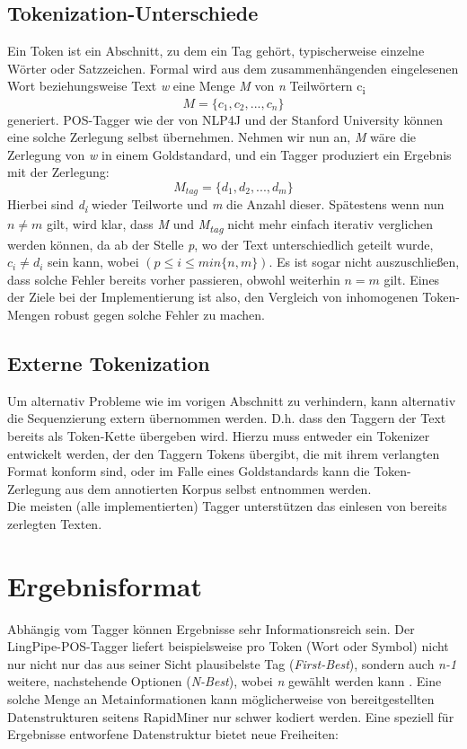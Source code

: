 \subsection{Tokenization-Unterschiede}
\label{sec:concept:sequence:tok}

Ein Token ist ein Abschnitt, zu dem ein Tag gehört, typischerweise einzelne Wörter oder Satzzeichen. Formal wird aus dem zusammenhängenden eingelesenen Wort beziehungsweise Text \textit{w} eine Menge \textit{M} von \textit{n} Teilwörtern c\textsubscript{i} 
 \[  M = \{ c_1 , c_2 , ... , c_n \} \] 
 generiert. POS-Tagger wie der von NLP4J \cite{choi} und der Stanford University \cite{Paper:StanfordTagger} können eine solche Zerlegung selbst übernehmen. Nehmen wir nun an, \textit{M} wäre die Zerlegung von \textit{w} in einem Goldstandard, und ein Tagger produziert ein Ergebnis mit der Zerlegung:
 \[  M_{tag} = \{ d_1 , d_2 , ... , d_m \} \]
Hierbei sind \textit{d\textsubscript{i}} wieder Teilworte und \textit{m} die Anzahl dieser. Spätestens wenn nun $n \neq m$ gilt, wird klar, dass \textit{M} und \textit{M\textsubscript{tag}} nicht mehr einfach iterativ verglichen werden können, da ab der Stelle \textit{p}, wo der Text unterschiedlich geteilt wurde, $ c_i \neq d_i $ sein kann, wobei $ (p \leq i \leq min\{ n, m \}) $. Es ist sogar nicht auszuschließen, dass solche Fehler bereits vorher passieren, obwohl weiterhin $n = m$ gilt.
\newline
Eines der Ziele bei der Implementierung ist also, den Vergleich von inhomogenen Token-Mengen robust gegen solche Fehler zu machen. 

\subsection{Externe Tokenization}
Um alternativ Probleme wie im vorigen Abschnitt zu verhindern, kann alternativ die Sequenzierung extern übernommen werden. D.h. dass den Taggern der Text bereits als Token-Kette übergeben wird. Hierzu muss entweder ein Tokenizer entwickelt werden, der den Taggern Tokens übergibt, die mit ihrem verlangten Format konform sind, oder im Falle eines Goldstandards kann die Token-Zerlegung aus dem annotierten Korpus selbst entnommen werden.
\\ Die meisten (alle implementierten) Tagger unterstützen das einlesen von bereits zerlegten Texten.



\section{Ergebnisformat}
\label{sec:concept:format}
Abhängig vom Tagger können Ergebnisse sehr Informationsreich sein. Der LingPipe-POS-Tagger liefert beispielsweise pro Token (Wort oder Symbol) nicht nur nicht nur das aus seiner Sicht plausibelste Tag (\textit{First-Best}), sondern auch \textit{n-1} weitere, nachstehende Optionen (\textit{N-Best}), wobei \textit{n} gewählt werden kann \cite{Lingpipedoc} . Eine solche Menge an Metainformationen kann möglicherweise von bereitgestellten Datenstrukturen seitens RapidMiner nur schwer kodiert werden. Eine speziell für Ergebnisse entworfene Datenstruktur bietet neue Freiheiten:

